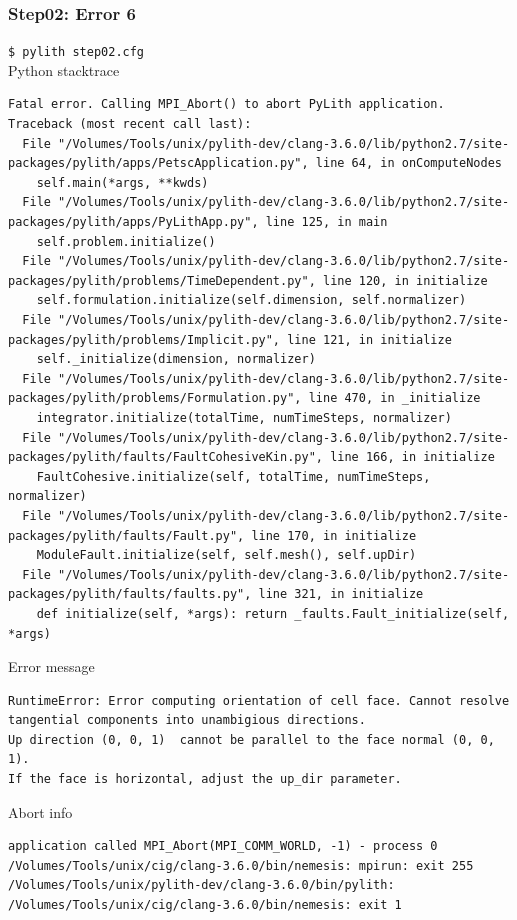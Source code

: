 \documentclass[aspectration=169]{beamer}
\newcommand{\cmd}[1]{{\footnotesize\tt \color{ltred}#1}}
\newcommand{\errlabel}[1]{{\small \color{blue}#1}}
\begin{document}
\begin{frame}[fragile]
  \frametitle{Step02: Error 6}

\cmd{\$ pylith step02.cfg}\\
\errlabel{Python stacktrace}
\begin{lstlisting}
Fatal error. Calling MPI_Abort() to abort PyLith application.
Traceback (most recent call last):
  File "/Volumes/Tools/unix/pylith-dev/clang-3.6.0/lib/python2.7/site-packages/pylith/apps/PetscApplication.py", line 64, in onComputeNodes
    self.main(*args, **kwds)
  File "/Volumes/Tools/unix/pylith-dev/clang-3.6.0/lib/python2.7/site-packages/pylith/apps/PyLithApp.py", line 125, in main
    self.problem.initialize()
  File "/Volumes/Tools/unix/pylith-dev/clang-3.6.0/lib/python2.7/site-packages/pylith/problems/TimeDependent.py", line 120, in initialize
    self.formulation.initialize(self.dimension, self.normalizer)
  File "/Volumes/Tools/unix/pylith-dev/clang-3.6.0/lib/python2.7/site-packages/pylith/problems/Implicit.py", line 121, in initialize
    self._initialize(dimension, normalizer)
  File "/Volumes/Tools/unix/pylith-dev/clang-3.6.0/lib/python2.7/site-packages/pylith/problems/Formulation.py", line 470, in _initialize
    integrator.initialize(totalTime, numTimeSteps, normalizer)
  File "/Volumes/Tools/unix/pylith-dev/clang-3.6.0/lib/python2.7/site-packages/pylith/faults/FaultCohesiveKin.py", line 166, in initialize
    FaultCohesive.initialize(self, totalTime, numTimeSteps, normalizer)
  File "/Volumes/Tools/unix/pylith-dev/clang-3.6.0/lib/python2.7/site-packages/pylith/faults/Fault.py", line 170, in initialize
    ModuleFault.initialize(self, self.mesh(), self.upDir)
  File "/Volumes/Tools/unix/pylith-dev/clang-3.6.0/lib/python2.7/site-packages/pylith/faults/faults.py", line 321, in initialize
    def initialize(self, *args): return _faults.Fault_initialize(self, *args)
\end{lstlisting}
\errlabel{Error message}
\begin{lstlisting}
RuntimeError: Error computing orientation of cell face. Cannot resolve tangential components into unambigious directions.
Up direction (0, 0, 1)  cannot be parallel to the face normal (0, 0, 1).
If the face is horizontal, adjust the up_dir parameter.
\end{lstlisting}
\errlabel{Abort info}
\begin{lstlisting}
application called MPI_Abort(MPI_COMM_WORLD, -1) - process 0
/Volumes/Tools/unix/cig/clang-3.6.0/bin/nemesis: mpirun: exit 255
/Volumes/Tools/unix/pylith-dev/clang-3.6.0/bin/pylith: /Volumes/Tools/unix/cig/clang-3.6.0/bin/nemesis: exit 1
\end{lstlisting}

\end{frame}
\end{document}
